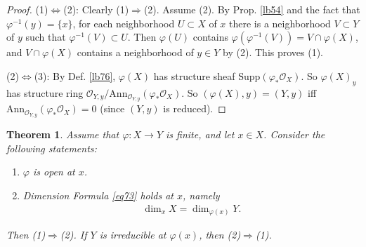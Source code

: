 \documentclass[12pt,b5paper,notitlepage]{report}
\theoremstyle{definition}
\theoremstyle{plain}
\newtheorem{thm}[df]{Theorem}
\newcommand{\scr}{\mathscr}
\newcommand{\Ann}{\mathrm{Ann}}
\newcommand{\Supp}{\mathrm{Supp}}
\numberwithin{equation}{section}
\begin{document}
\begin{proof}
(1)$\Leftrightarrow$(2): Clearly (1)$\Rightarrow$(2). Assume (2). By Prop. \ref{lb54} and the fact that $\varphi^{-1}(y)=\{x\}$, for each neighborhood $U\subset X$ of $x$ there is a neighborhood $V\subset Y$ of $y$ such that $\varphi^{-1}(V)\subset U$. Then $\varphi(U)$ contains $\varphi(\varphi^{-1}(V))=V\cap\varphi(X)$, and $V\cap\varphi(X)$ contains a neighborhood of $y\in Y$ by (2). This proves (1).

(2)$\Leftrightarrow$(3): By Def. \ref{lb76}, $\varphi(X)$ has structure sheaf $\Supp(\varphi_*\scr O_X)$. So $\varphi(X)_y$ has structure ring $\scr O_{Y,y}/\Ann_{\scr O_{Y,y}}(\varphi_*\scr O_X)$. So $(\varphi(X),y)=(Y,y)$ iff $\Ann_{\scr O_{Y,y}}(\varphi_*\scr O_X)=0$ (since $(Y,y)$ is reduced).
\end{proof}


\begin{thm}\label{lb158}
Assume that $\varphi:X\rightarrow Y$ is finite, and let $x\in X$. Consider the following statements:
\begin{enumerate}[label=(\arabic*)]
\item $\varphi$ is open at $x$.
\item Dimension Formula \eqref{eq73} holds at $x$, namely
\begin{align}
\dim_xX=\dim_{\varphi(x)}Y. \label{eq74}
\end{align}
\end{enumerate}
Then (1)$\Rightarrow$(2). If $Y$ is irreducible at $\varphi(x)$, then (2)$\Rightarrow$(1).
\end{thm}
\end{document}
